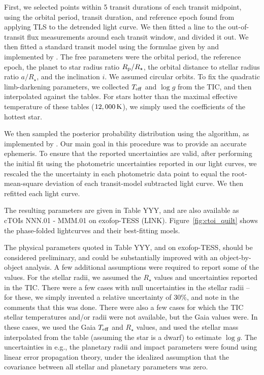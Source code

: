 \documentclass[12pt,twocolumn,tighten]{aastex62}
\begin{document}
First, we selected points within 5 transit durations of each transit
midpoint, using the orbital period, transit duration, and reference
epoch found from applying TLS to the detrended light curve.  We then
fitted a line to the out-of-transit flux measurements around each
transit window, and divided it out.  We then fitted a standard transit
model using the formulae given by \citet{mandel_analytic_2002} and
implemented by \citet[][\texttt{BATMAN}]{kreidberg_batman_2015}.  The
free parameters were the orbital period, the reference epoch, the
planet to star radius ratio $R_{\rm p}/R_\star$, the orbital distance
to stellar radius ratio $a/R_\star$, and the inclination $i$.  We
assumed circular orbits.  To fix the quadratic limb-darkening
parameters, we collected $T_{\rm eff}$ and $\log g$ from the TIC, and
then interpolated against the \citet{claret_limb_2017} tables.  For
stars hotter than the maximal effective temperature of these tables
($12,000\,{\rm K}$), we simply used the coefficients of the hottest
star.

We then sampled the posterior probability distribution using the
\citet{goodman_ensemble_2010} algorithm, as implemented by
\citet[][\texttt{emcee}]{foreman-mackey_emcee_2013}.  Our main goal in
this procedure was to provide an accurate ephemeris.  To ensure that
the reported uncertainties are valid, after performing the initial fit
using the photometric uncertainties reported in our light curves, we
rescaled the the uncertainty in each photometric data point to equal
the root-mean-square deviation of each transit-model subtracted light
curve. We then refitted each light curve.

The resulting parameters are given in Table YYY, and are also
available as cTOIs NNN.01 - MMM.01 on exofop-TESS (LINK).
Figure~\ref{fig:ctoi_quilt} shows the phase-folded lightcurves and
their best-fitting moels.

The physical parameters quoted in Table YYY, and on exofop-TESS,
should be considered preliminary, and could be substantially improved
with an object-by-object analysis.  A few additional assumptions were
required to report some of the values.  For the stellar radii, we
assumed the $R_\star$ values and uncertainties reported in the TIC.
There were a few cases with null uncertainties in the stellar radii --
for these, we simply invented a relative uncertainty of 30\%, and note
in the comments that this was done.  There were also a few cases for
which the TIC stellar temperatures and/or radii were not available,
but the Gaia values were.  In these cases, we used the Gaia $T_{\rm
eff}$ and $R_\star$ values, and used the stellar mass interpolated
from the \citet{pecaut_intrinsic_2013} table (assuming the star is a
dwarf) to estimate $\log g$.  The uncertainties in e.g., the planetary
radii and impact parameters were found using linear error propagation
theory, under the idealized assumption that the covariance between all
stellar and planetary parameters was zero.
\end{document}
